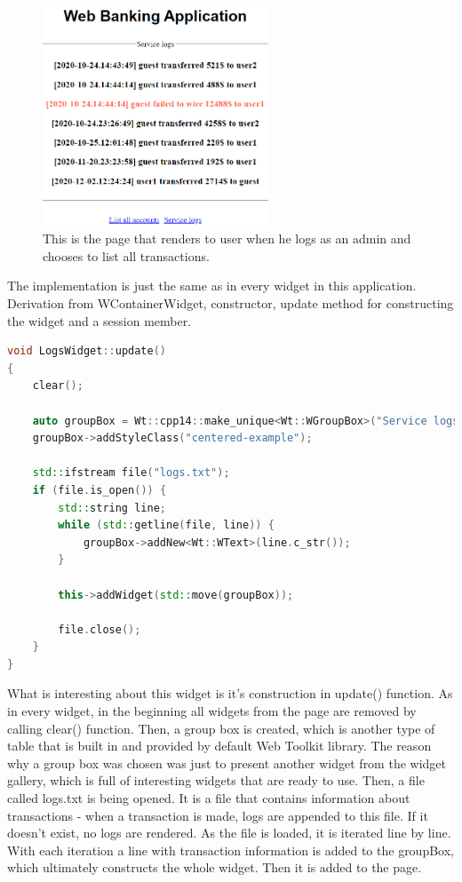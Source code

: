 \documentclass[a4paper,12pt]{book}
\begin{document}
{{\begin{figure}[H]
\centering
\includegraphics[width=0.6\textwidth]{servicelogs}
\caption{This is the page that renders to user when he logs as an admin and chooses to list all transactions.}
\end{figure}

\bigskip
The implementation is just the same as in every widget in this application. Derivation from WContainerWidget, constructor, update method for constructing the widget and a session member.

\bigskip
\begin{lstlisting}[frame=single, basicstyle=\small, language=C++, caption={LogsWidget::update() function.}, captionpos=b]
void LogsWidget::update()
{
	clear();

	auto groupBox = Wt::cpp14::make_unique<Wt::WGroupBox>("Service logs");
	groupBox->addStyleClass("centered-example");

	std::ifstream file("logs.txt");
	if (file.is_open()) {
		std::string line;
		while (std::getline(file, line)) {
			groupBox->addNew<Wt::WText>(line.c_str());
		}

		this->addWidget(std::move(groupBox));

		file.close();
	}
}
\end{lstlisting}

What is interesting about this widget is it's construction in update() function. As in every widget, in the beginning all widgets from the page are removed by calling clear() function. Then, a group box is created, which is  another type of table that is built in and provided by default Web Toolkit library. The reason why a group box was chosen was just to present another widget from the widget gallery, which is full of interesting widgets that are ready to use. Then, a file called logs.txt is being opened. It is a file that contains information about transactions - when a transaction is made, logs are appended to this file. If it doesn't exist, no logs are rendered. As the file is loaded, it is iterated line by line. With each iteration a line with transaction information is added to the groupBox, which ultimately constructs the whole widget. Then it is added to the page. 

}}
\end{document}
